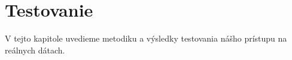 \chapter{Testovanie}

\label{kap:testovanie}

V tejto kapitole uvedieme metodiku a výsledky testovania nášho prístupu na reálnych dátach.
